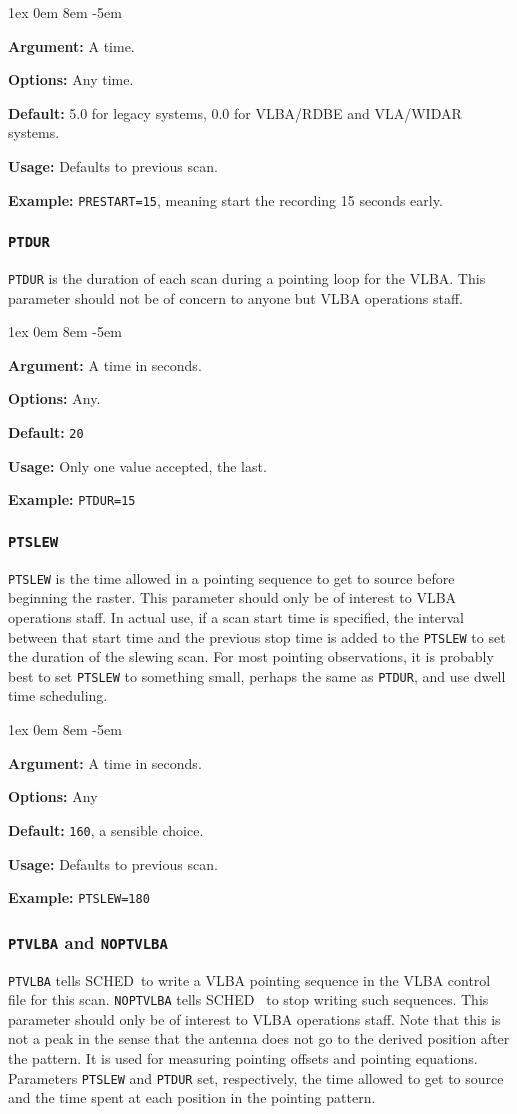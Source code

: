 \documentclass{report}
\newcommand{\schedb}{{\sc SCHED~}}
\newcommand{\rcwbox}[5]{
  \begin{list}{}{\parsep 1ex  \itemsep 0em
                 \leftmargin 8em  \itemindent -5em }
    \item {\bf Argument:} #1
    \item {\bf Options:}  #2
    \item {\bf Default:}  #3
    \item {\bf Usage:}    #4
    \item {\bf Example:}  #5
  \end{list}
}
\begin{document}
\rcwbox
{A time.}
{Any time.}
{5.0 for legacy systems, 0.0 for VLBA/RDBE and VLA/WIDAR systems.}
{Defaults to previous scan.}
{{\tt PRESTART=15}, meaning start the recording 15 seconds early.}

\subsubsection{\label{MP:PTDUR}{\tt PTDUR}}

{\tt PTDUR} is the duration of each scan during a pointing loop for
the VLBA. This parameter should not be of concern to anyone but VLBA
operations staff.

\rcwbox
{A time in seconds.}
{Any.}
{{\tt 20}}
{Only one value accepted, the last.}
{{\tt PTDUR=15}}


\subsubsection{\label{MP:PTSLEW}{\tt PTSLEW}}

{\tt PTSLEW} is the time allowed in a pointing sequence to get to
source before beginning the raster. This parameter should only be of
interest to VLBA operations staff. In actual use, if a scan start time
is specified, the interval between that start time and the previous
stop time is added to the {\tt PTSLEW} to set the duration of the
slewing scan.  For most pointing observations, it is probably best
to set {\tt PTSLEW} to something small, perhaps the same as {\tt PTDUR},
and use dwell time scheduling.

\rcwbox
{A time in seconds.}
{Any}
{{\tt 160}, a sensible choice.}
{Defaults to previous scan.}
{{\tt PTSLEW=180}}


\subsubsection{\label{MP:PTVLBA}{\tt PTVLBA} and {\tt NOPTVLBA}}

{\tt PTVLBA} tells \schedb to write a VLBA pointing sequence in
the VLBA control file for this scan. {\tt NOPTVLBA} tells \schedb
to stop writing such sequences.  This parameter should only be of
interest to VLBA operations staff. Note that this is not a peak in the
sense that the antenna does not go to the derived position after the
pattern. It is used for measuring pointing offsets and pointing
equations. Parameters {\tt PTSLEW} and {\tt PTDUR} set, respectively,
the time allowed to get to source and the time spent at each position
in the pointing pattern.
\end{document}
